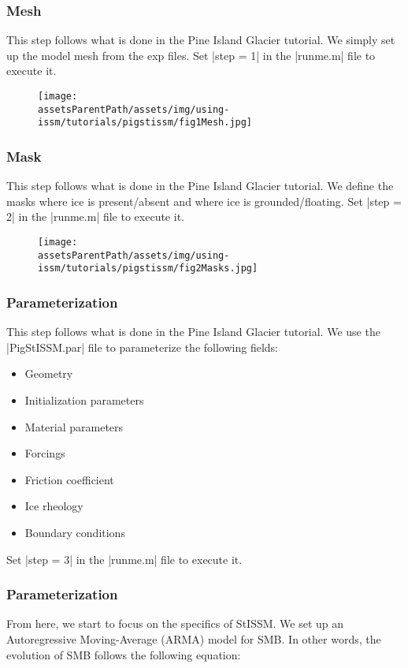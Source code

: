 \subsubsection{Mesh}%
This step follows what is done in the Pine Island Glacier tutorial. We simply set up the model mesh from the exp files. Set \lstinlinebg|step = 1| in the \lstinlinebg|runme.m| file to execute it.
\begin{figure}
	\begin{center}
		\texttt{[image: \\assetsParentPath/assets/img/using-issm/tutorials/pigstissm/fig1Mesh.jpg]}
	\end{center}
\end{figure}

\subsubsection{Mask}%
This step follows what is done in the Pine Island Glacier tutorial. We define the masks where ice is present/absent and where ice is grounded/floating. Set \lstinlinebg|step = 2| in the \lstinlinebg|runme.m| file to execute it.
\begin{figure}
	\begin{center}
		\texttt{[image: \\assetsParentPath/assets/img/using-issm/tutorials/pigstissm/fig2Masks.jpg]}
	\end{center}
\end{figure}

\subsubsection{Parameterization}%
This step follows what is done in the Pine Island Glacier tutorial. We use the \lstinlinebg|PigStISSM.par| file to parameterize the following fields:
\begin{itemize}
	\item Geometry
	\item Initialization parameters
	\item Material parameters
	\item Forcings
	\item Friction coefficient
	\item Ice rheology
	\item Boundary conditions
\end{itemize}
Set \lstinlinebg|step = 3| in the \lstinlinebg|runme.m| file to execute it.

\subsubsection{Parameterization}%
From here, we start to focus on the specifics of StISSM. We set up an Autoregressive Moving-Average (ARMA) model for SMB. In other words, the evolution of SMB follows the following equation:

